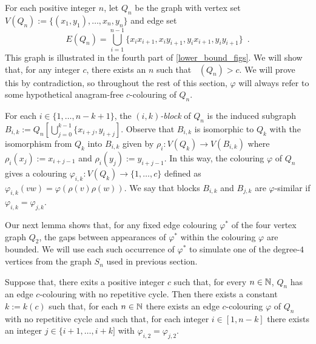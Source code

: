 \documentclass[kpfonts]{patmorin}
\DeclareMathOperator{\ci}{\overline{\pi}}
\begin{document}
For each positive integer $n$, let $Q_n$ be the graph with vertex set $V(Q_n):=\{(x_1,y_1),\ldots,x_n,y_n\}$ and edge set
\[
    E(Q_n) = \bigcup_{i=1}^{n-1} \{x_ix_{i+1}, x_iy_{i+1}, y_{i}x_{i+1}, y_{i}y_{i+1}\} \enspace .
\]
This graph is illustrated in the fourth part of \cref{lower_bound_figs}.
We will show that, for any integer $c$, there exists an $n$ such that $\ci(Q_n)>c$.  We will prove this by contradiction, so throughout the rest of this section, $\varphi$ will always refer to some hypothetical anagram-free $c$-colouring of $Q_n$.

For each $i\in\{1,\ldots,n-k+1\}$, the \emph{$(i,k)$-block} of $Q_n$ is the induced subgraph $B_{i,k}:=Q_n[\bigcup_{j=0}^{k-1}\{x_{i+j},y_{i+j}]$. Observe that $B_{i,k}$ is isomorphic to $Q_k$ with the isomorphism from $Q_k$ into $B_{i,k}$ given by $\rho_{i}:V(Q_k)\to V(B_{i,k})$ where $\rho_{i}(x_{j}):= x_{i+j-1}$ and $\rho_i(y_j):= y_{i+j-1}$.  In this way, the colouring $\varphi$ of $Q_n$ gives a colouring $\varphi_{i,k}:V(Q_k)\to\{1,\ldots,c\}$ defined as $\varphi_{i,k}(vw) = \varphi(\rho(v)\rho(w))$.  We say that blocks $B_{i,k}$ and $B_{j,k}$ are $\varphi$-similar if $\varphi_{i,k}=\varphi_{j,k}$.


Our next lemma shows that, for any fixed edge colouring $\varphi^*$ of the four vertex graph $Q_2$, the gaps between appearances of $\varphi^*$ within the colouring $\varphi$ are bounded.  We will use each such occurrence of $\varphi^*$ to simulate one of the degree-$4$ vertices from the graph $S_n$ used in previous section.

\begin{lem}\label{periodicity}
    Suppose that, there exits a positive integer $c$ such that, for every $n\in\mathbb{N}$, $Q_n$ has an edge $c$-colouring with no repetitive cycle.  Then there exists a constant $k:=k(c)$ such that, for each $n\in\mathbb{N}$ there exists an edge $c$-colouring $\varphi$ of $Q_{n}$ with no repetitive cycle and such that, for each integer $i\in[1, n-k]$ there exists an integer $j\in\{ i+1,\ldots,i+k]$ with $\varphi_{i,2}=\varphi_{j,2}$.
\end{lem}
\end{document}
